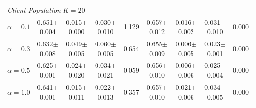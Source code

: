 \begin{table}[t]
{\begin{tabular}{lcccccccc}
\midrule
\multicolumn{9}{l}{\textit{Client Population $K = 20$}} \\
$\alpha = 0.1$ & 0.651$\pm$0.004 & 0.015$\pm$0.000 & 0.030$\pm$0.010 & 1.129 & 0.657$\pm$0.012 & 0.016$\pm$0.002 & 0.031$\pm$0.010 & 0.000 \\
$\alpha = 0.3$ & 0.632$\pm$0.008 & 0.049$\pm$0.005 & 0.060$\pm$0.005 & 0.654 & 0.655$\pm$0.009 & 0.006$\pm$0.005 & 0.023$\pm$0.001 & 0.000 \\
$\alpha = 0.5$ & 0.625$\pm$0.001 & 0.024$\pm$0.020 & 0.034$\pm$0.021 & 0.059 & 0.656$\pm$0.010 & 0.006$\pm$0.006 & 0.025$\pm$0.004 & 0.000 \\
$\alpha = 1.0$ & 0.641$\pm$0.001 & 0.015$\pm$0.011 & 0.022$\pm$0.013 & 0.357 & 0.657$\pm$0.010 & 0.021$\pm$0.006 & 0.034$\pm$0.005 & 0.000 \\
\bottomrule
\end{tabular}%
}
\end{table}

